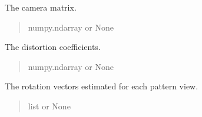 \documentclass[letterpaper,10pt,english]{sphinxmanual}
\begin{document}
\begin{fulllineitems}

\begin{fulllineitems}
\label{\detokenize{CameraUtils:CameraUtils.Camera.mtx}}
\pysigstartsignatures
{}
\pysigstopsignatures
\sphinxAtStartPar
The camera matrix.
\begin{quote}\begin{description}
\sphinxAtStartPar
numpy.ndarray or None

\end{description}\end{quote}

\end{fulllineitems}


\begin{fulllineitems}
\label{\detokenize{CameraUtils:CameraUtils.Camera.dist}}
\pysigstartsignatures
{}
\pysigstopsignatures
\sphinxAtStartPar
The distortion coefficients.
\begin{quote}\begin{description}
\sphinxAtStartPar
numpy.ndarray or None

\end{description}\end{quote}

\end{fulllineitems}


\begin{fulllineitems}
\label{\detokenize{CameraUtils:CameraUtils.Camera.rvecs}}
\pysigstartsignatures
{}
\pysigstopsignatures
\sphinxAtStartPar
The rotation vectors estimated for each pattern view.
\begin{quote}\begin{description}
\sphinxAtStartPar
list or None

\end{description}\end{quote}

\end{fulllineitems}


\end{fulllineitems}
\end{document}
